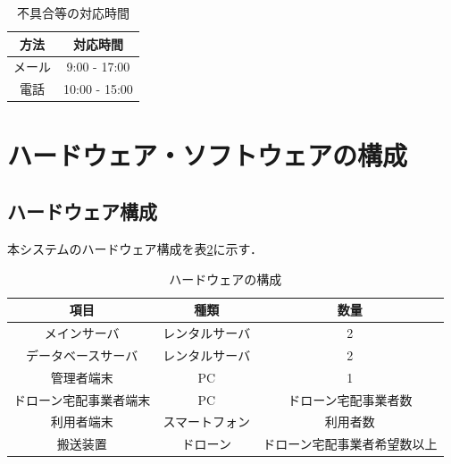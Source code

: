 \documentclass[a4paper, titlepage]{jsarticle}
\begin{document}
\begin{table}[htbp]
  \centering
  \begin{tabular}{c|c} \hline
    方法 & 対応時間 \\ \hline
    メール & 9:00 - 17:00 \\
    電話 & 10:00 - 15:00 \\ \hline
  \end{tabular}
  \caption{不具合等の対応時間}
  \label{tb:huguai}
\end{table}

\section{ハードウェア・ソフトウェアの構成}
\subsection{ハードウェア構成}
本システムのハードウェア構成を表\ref{fig:hardware}に示す．
\begin{table}[H]
        \begin{center}
                \caption{ハードウェアの構成}
                \label{fig:hardware}
                \begin{tabular}{ccc} \hline
                        項目          & 種類      & 数量             \\ \hline \hline
                        メインサーバ      & レンタルサーバ & 2              \\
                        データベースサーバ   & レンタルサーバ & 2              \\
                        管理者端末       & PC      & 1              \\
                        ドローン宅配事業者端末 & PC      & ドローン宅配事業者数     \\
                        利用者端末       & スマートフォン & 利用者数           \\
                        搬送装置        & ドローン    & ドローン宅配事業者希望数以上 \\ \hline
                \end{tabular}
        \end{center}
\end{table}
\end{document}
